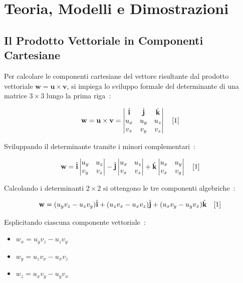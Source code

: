 \documentclass[12pt, a4paper]{article}
\begin{document}
\section{Teoria, Modelli e Dimostrazioni}

\subsection{Il Prodotto Vettoriale in Componenti Cartesiane}

Per calcolare le componenti cartesiane del vettore risultante dal prodotto vettoriale $\mathbf{w} = \mathbf{u} \times \mathbf{v}$, si impiega lo sviluppo formale del determinante di una matrice $3 \times 3$ lungo la prima riga~\cite{1}:

\[
\mathbf{w} = \mathbf{u} \times \mathbf{v} = 
\begin{vmatrix} 
\hat{\mathbf{i}} & \hat{\mathbf{j}} & \hat{\mathbf{k}} \\ 
u_x & u_y & u_z \\ 
v_x & v_y & v_z 
\end{vmatrix} \quad \text{\cite{1}}
\]

Sviluppando il determinante tramite i minori complementari~\cite{1}:

\[
\mathbf{w} = \hat{\mathbf{i}} \begin{vmatrix} u_y & u_z \\ v_y & v_z \end{vmatrix} - \hat{\mathbf{j}} \begin{vmatrix} u_x & u_z \\ v_x & v_z \end{vmatrix} + \hat{\mathbf{k}} \begin{vmatrix} u_x & u_y \\ v_x & v_y \end{vmatrix} \quad \text{\cite{1}}
\]

Calcolando i determinanti $2 \times 2$ si ottengono le tre componenti algebriche~\cite{1}:

\[
\mathbf{w} = (u_y v_z - u_z v_y) \hat{\mathbf{i}} + (u_z v_x - u_x v_z) \hat{\mathbf{j}} + (u_x v_y - u_y v_x) \hat{\mathbf{k}} \quad \text{\cite{1}}
\]

Esplicitando ciascuna componente vettoriale~\cite{1}:
\begin{itemize}
    \item $w_x = u_y v_z - u_z v_y$~\cite{1}
    \item $w_y = u_z v_x - u_x v_z$~\cite{1}
    \item $w_z = u_x v_y - u_y v_x$~\cite{1}
\end{itemize}
\end{document}
